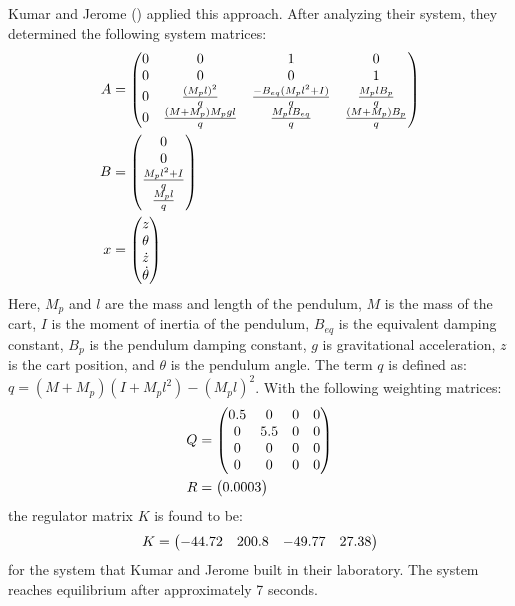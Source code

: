 Kumar and Jerome (\citeyear{vinodh_kumar_robust_2013}) applied this approach. After analyzing their system, they determined the following system matrices:
\begin{align}
    A &= \begin{pmatrix}
        0 & 0 & 1 & 0 \\
        0 & 0 & 0 & 1 \\
        0 & \frac{(M_pl)^2}{q} & \frac{-B_{eq}(M_pl^2 + I)}{q} & \frac{M_plB_p}{q} \\
        0 & \frac{(M+M_p)M_pgl}{q} & \frac{M_plB_{eq}}{q} & \frac{(M+M_p)B_p}{q}
    \end{pmatrix} \notag \\
    B &= \begin{pmatrix}
        0 \\
        0 \\
        \frac{M_pl^2+I}{q} \\
        \frac{M_pl}{q}
    \end{pmatrix} \notag \\
    x &= \begin{pmatrix}
        z \\
        \theta \\
        \dot{z} \\
        \dot{\theta}
    \end{pmatrix} \notag
\end{align}
Here, $M_p$ and $l$ are the mass and length of the pendulum, $M$ is the mass of the cart, $I$ is the moment of inertia of the pendulum, $B_{eq}$ is the equivalent damping constant, $B_p$ is the pendulum damping constant, $g$ is gravitational acceleration, $z$ is the cart position, and $\theta$ is the pendulum angle. The term $q$ is defined as: $q = (M+M_p)(I+M_pl^2) - (M_pl)^2$. With the following weighting matrices:
\begin{align}
    Q &= \begin{pmatrix}
        0.5 & 0 & 0 & 0 \\
        0 & 5.5 & 0 & 0 \\
        0 & 0 & 0 & 0 \\
        0 & 0 & 0 & 0
    \end{pmatrix} \notag \\
    R &= \begin{pmatrix}
        0.0003
    \end{pmatrix} \notag
\end{align}
the regulator matrix $K$ is found to be:
\begin{align}
    K = \begin{pmatrix}
        -44.72 & 200.8 & -49.77 & 27.38
    \end{pmatrix} \notag
\end{align}
for the system that Kumar and Jerome built in their laboratory. The system reaches equilibrium after approximately 7 seconds.


